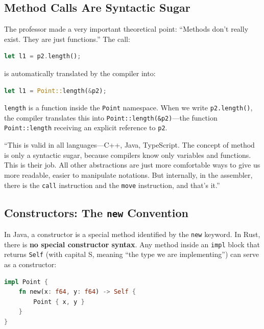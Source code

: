 \subsection{Method Calls Are Syntactic Sugar}

The professor made a very important theoretical point: ``Methods don't really exist. They are just functions.'' The call:

\begin{lstlisting}[language=Rust]
let l1 = p2.length();
\end{lstlisting}

is automatically translated by the compiler into:

\begin{lstlisting}[language=Rust]
let l1 = Point::length(&p2);
\end{lstlisting}

\texttt{length} is a function inside the \texttt{Point} namespace. When we write \texttt{p2.length()}, the compiler translates this into \texttt{Point::length(\&p2)}---the function \texttt{Point::length} receiving an explicit reference to \texttt{p2}.

\begin{insightbox}
``This is valid in all languages---C++, Java, TypeScript. The concept of method is only a syntactic sugar, because compilers know only variables and functions. This is their job. All other abstractions are just more comfortable ways to give us more readable, easier to manipulate notations. But internally, in the assembler, there is the \texttt{call} instruction and the \texttt{move} instruction, and that's it.''
\end{insightbox}

\subsection{Constructors: The \texttt{new} Convention}

In Java, a constructor is a special method identified by the \texttt{new} keyword. In Rust, there is \textbf{no special constructor syntax}. Any method inside an \texttt{impl} block that returns \texttt{Self} (with capital S, meaning ``the type we are implementing'') can serve as a constructor:

\begin{lstlisting}[language=Rust]
impl Point {
    fn new(x: f64, y: f64) -> Self {
        Point { x, y }
    }
}
\end{lstlisting}

